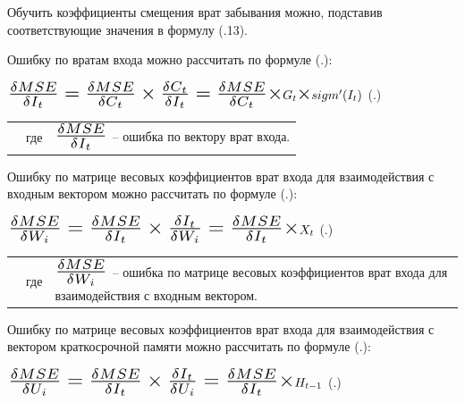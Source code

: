 {  \par \redline Обучить коэффициенты смещения врат забывания можно, подставив соответствующие значения в формулу (\thechaptercntr .13).

  \par \redline Ошибку по вратам входа можно рассчитать по формуле (\thechaptercntr .\theformulacntr):

  \formulaspace \par \redline 
    $\scaleto{\frac{\delta MSE}{\delta I_t} = \frac{\delta MSE}{\delta C_t} \times \frac{\delta C_t}{\delta I_t} = \frac{\delta MSE}{\delta C_t} \times }{21pt} G_t \scaleto{\times}{10pt} sigm'(I_t)$
    \hfill (\thechaptercntr .\theformulacntr) \redline
  \formulaspace \addtocounter{formulacntr}{1}

  \begin{tabular}{p{}p{}p{}}
		& где  & $\scaleto{\frac{\delta MSE}{\delta I_t}}{21pt}$ {--} ошибка по вектору врат входа. \\
  \end{tabular}

  \par \redline Ошибку по матрице весовых коэффициентов врат входа для взаимодействия с входным вектором можно рассчитать по формуле (\thechaptercntr .\theformulacntr):

  \formulaspace \par \redline 
    $\scaleto{\frac{\delta MSE}{\delta W_i} = \frac{\delta MSE}{\delta I_t} \times \frac{\delta I_t}{\delta W_i} = \frac{\delta MSE}{\delta I_t} \times }{22pt} X_t$
    \hfill (\thechaptercntr .\theformulacntr) \redline
  \formulaspace \addtocounter{formulacntr}{1}

  \begin{tabular}{p{}p{}p{}}
		& где  & $\scaleto{\frac{\delta MSE}{\delta W_i}}{21pt}$ {--} ошибка по матрице весовых коэффициентов врат входа для взаимодействия с входным вектором. \\
  \end{tabular}

  \par \redline Ошибку по матрице весовых коэффициентов врат входа для взаимодействия с вектором краткосрочной памяти можно рассчитать по формуле (\thechaptercntr .\theformulacntr):

  \formulaspace \par \redline 
    $\scaleto{\frac{\delta MSE}{\delta U_i} = \frac{\delta MSE}{\delta I_t} \times \frac{\delta I_t}{\delta U_i} = \frac{\delta MSE}{\delta I_t} \times }{22pt} H_{t-1}$
    \hfill (\thechaptercntr .\theformulacntr) \redline
  \formulaspace \addtocounter{formulacntr}{1}

}
